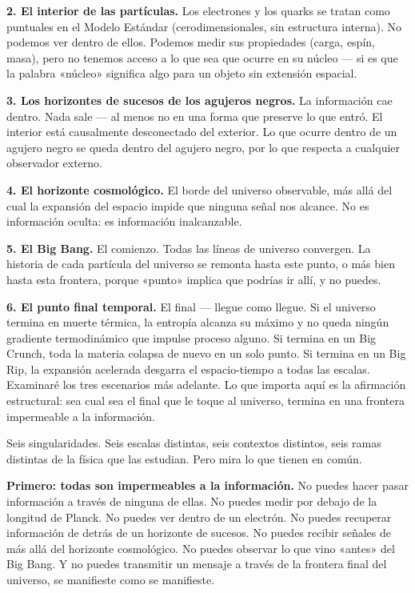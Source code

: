 \documentclass[11pt, twoside, openright]{book}
\begin{document}
\textbf{2. El interior de las partículas.} Los electrones y los quarks se tratan como puntuales en el Modelo Estándar (cerodimensionales, sin estructura interna). No podemos ver dentro de ellos. Podemos medir sus propiedades (carga, espín, masa), pero no tenemos acceso a lo que sea que ocurre en su núcleo --- si es que la palabra «núcleo» significa algo para un objeto sin extensión espacial.

\textbf{3. Los horizontes de sucesos de los agujeros negros.} La información cae dentro. Nada sale --- al menos no en una forma que preserve lo que entró. El interior está causalmente desconectado del exterior. Lo que ocurre dentro de un agujero negro se queda dentro del agujero negro, por lo que respecta a cualquier observador externo.

\textbf{4. El horizonte cosmológico.} El borde del universo observable, más allá del cual la expansión del espacio impide que ninguna señal nos alcance. No es información oculta: es información inalcanzable.

\textbf{5. El Big Bang.} El comienzo. Todas las líneas de universo convergen. La historia de cada partícula del universo se remonta hasta este punto, o más bien hasta esta frontera, porque «punto» implica que podrías ir allí, y no puedes.

\textbf{6. El punto final temporal.} El final --- llegue como llegue. Si el universo termina en muerte térmica, la entropía alcanza su máximo y no queda ningún gradiente termodinámico que impulse proceso alguno. Si termina en un Big Crunch, toda la materia colapsa de nuevo en un solo punto. Si termina en un Big Rip, la expansión acelerada desgarra el espacio-tiempo a todas las escalas. Examinaré los tres escenarios más adelante. Lo que importa aquí es la afirmación estructural: sea cual sea el final que le toque al universo, termina en una frontera impermeable a la información.

Seis singularidades. Seis escalas distintas, seis contextos distintos, seis ramas distintas de la física que las estudian. Pero mira lo que tienen en común.

\textbf{Primero: todas son impermeables a la información.} No puedes hacer pasar información a través de ninguna de ellas. No puedes medir por debajo de la longitud de Planck. No puedes ver dentro de un electrón. No puedes recuperar información de detrás de un horizonte de sucesos. No puedes recibir señales de más allá del horizonte cosmológico. No puedes observar lo que vino «antes» del Big Bang. Y no puedes transmitir un mensaje a través de la frontera final del universo, se manifieste como se manifieste.
\end{document}
